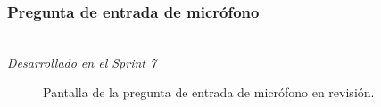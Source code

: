 \newpage

\subsubsection{Pregunta de entrada de micrófono}\mbox{}\\

\label{sec:pregunic1b}
\textit{Desarrollado en el Sprint 7}
\begin{figure}[H]%
  \centering
  \qquad
  \caption{Pantalla de la pregunta de entrada de micrófono en revisión.}%
  \label{fig:example}%
\end{figure}



